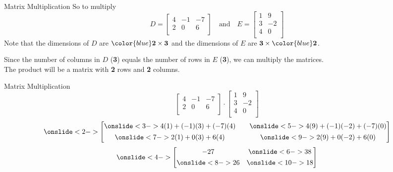 \documentclass[t]{beamer}
\begin{document}
\begin{frame}{Matrix Multiplication}
So to multiply 
\[
D =
\begin{bmatrix}
4   &   -1  &   -7 \\
2   &   0   &   6   \\
\end{bmatrix}
\quad   \text{and}  \quad
E =
\begin{bmatrix}
1   &   9   \\
3   &   -2  \\
4   &   0   \\
\end{bmatrix}
\]
\pause 
Note that the dimensions of $D$ are ${\color{blue}\textbf{2}} \times \mathbf{3}$ and the dimensions of $E$ are $\mathbf{3} \times {\color{blue}\textbf{2}}$. \newline\\
\pause

Since the number of columns in $D$ (\textbf{3}) equals the number of rows in $E$ (\textbf{3}), we can multiply the matrices. \newline\\

The product will be a matrix with {\color{blue}\textbf{2}} rows and {\color{blue}\textbf{2}} columns. 
\end{frame}

\begin{frame}{Matrix Multiplication}
\[ 
\begin{bmatrix}
4 & -1 & -7 \\
2	&	0	&	6 \\
\end{bmatrix}  \cdot
\begin{bmatrix}
1	&	9	\\
3	&	-2	\\
4	&	0	\\
\end{bmatrix}
\]
\vspace{10pt}
\[
\onslide<2->{
\begin{bmatrix}
\onslide<3->{4(1) + (-1)(3) + (-7)(4)}	\quad &	\onslide<5->{4(9) + (-1)(-2) + (-7)(0)} 	\\[4pt]
\onslide<7->{2(1) + 0(3) + 6(4)}	\quad &	\onslide<9->{2(9) + 0(-2) + 6(0)}	\\
\end{bmatrix} }
\]
\vspace{10pt}
\[
\onslide<4->{
\begin{bmatrix}
-27 						& \onslide<6->{38}	\\[4pt] 
\onslide<8->{26}	&	\onslide<10->{18}\\
\end{bmatrix} }
\]
\end{frame}
\end{document}
